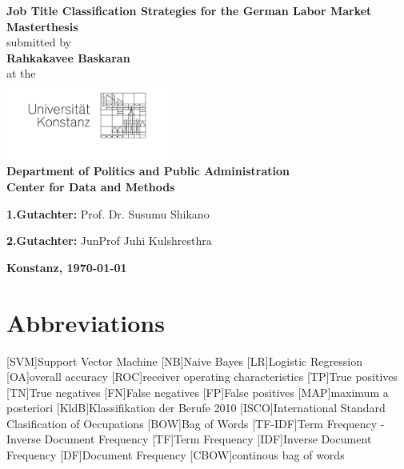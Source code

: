 \documentclass[12pt, a4paper, titlepage]{article}
\begin{document}
\begin{titlepage}
    \begin{center}
    {\LARGE \textbf{Job Title Classification Strategies for the German Labor Market}}
    \\[1cm]
    {\Large \textbf{Masterthesis}}
    \\[1cm]
    {\Large submitted by}
    \\[0.5cm]
    {\LARGE \textbf{Rahkakavee Baskaran}}
    \\[0.5cm]
    {\Large at the}
    \\[0.5cm]
    \includegraphics[width=0.4\textwidth]{logo.jpg}
    \\[1cm]
    {\Large \textbf{Department of Politics and Public Administration}}
    \\[1cm]
    {\Large \textbf{Center for Data and Methods}}
    \\[2cm]
    \begin{minipage}[c]{0.8\textwidth}
    \begin{description}
     \item {\Large \textbf{1.Gutachter:} Prof. Dr. Susumu Shikano}
     \item {\Large \textbf{2.Gutachter:} JunProf Juhi Kulshresthra}
    \end{description}
    \end{minipage}
    \vfill
    {\LARGE \textbf{Konstanz, \today}}
    \end{center}
    \end{titlepage}

\tableofcontents
\newpage


\section*{Abbreviations}
\begin{acronym}
  [SVM]{Support Vector Machine}
  [NB]{Naive Bayes}
  [LR]{Logistic Regression}
  [OA]{overall accuracy}
  [ROC]{receiver operating characteristics}
  [TP]{True positives}
  [TN]{True negatives}
  [FN]{False negatives}
  [FP]{False positives}
  [MAP]{maximum a posteriori}
  [KldB]{Klassifikation der Berufe 2010}
  [ISCO]{International Standard Clasification of Occupations}
  [BOW]{Bag of Words}
  [TF-IDF]{Term Frequency - Inverse Document Frequency}
  [TF]{Term Frequency}
  [IDF]{Inverse Document Frequency}
  [DF]{Document Frequency}
  [CBOW]{continous bag of words}
\end{acronym}
\newpage
\end{document}
